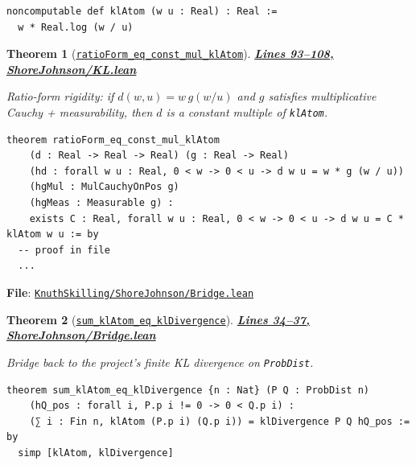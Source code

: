 \documentclass[11pt]{article}
\newtheorem{theorem}{Theorem}[section]
\theoremstyle{definition}
\theoremstyle{remark}
\begin{document}
\begin{lstlisting}[caption={KL atom divergence}]
noncomputable def klAtom (w u : Real) : Real :=
  w * Real.log (w / u)
\end{lstlisting}

\begin{theorem}[\href{https://github.com/zariuq/ks-foundations-of-inference/blob/main/KnuthSkilling/ShoreJohnson/KL.lean\#L93}{\texttt{ratioForm\_eq\_const\_mul\_klAtom}}]
\textbf{\href{https://github.com/zariuq/ks-foundations-of-inference/blob/main/KnuthSkilling/ShoreJohnson/KL.lean\#L93-L108}{Lines 93--108, ShoreJohnson/KL.lean}}

Ratio-form rigidity: if $d(w,u)=w \, g(w/u)$ and $g$ satisfies multiplicative Cauchy + measurability, then
$d$ is a constant multiple of \texttt{klAtom}.
\end{theorem}

\begin{lstlisting}[caption={Ratio-form rigidity -> constant multiple of klAtom}]
theorem ratioForm_eq_const_mul_klAtom
    (d : Real -> Real -> Real) (g : Real -> Real)
    (hd : forall w u : Real, 0 < w -> 0 < u -> d w u = w * g (w / u))
    (hgMul : MulCauchyOnPos g)
    (hgMeas : Measurable g) :
    exists C : Real, forall w u : Real, 0 < w -> 0 < u -> d w u = C * klAtom w u := by
  -- proof in file
  ...
\end{lstlisting}

\textbf{File}: \href{https://github.com/zariuq/ks-foundations-of-inference/blob/main/KnuthSkilling/ShoreJohnson/Bridge.lean}{\texttt{KnuthSkilling/ShoreJohnson/Bridge.lean}}

\begin{theorem}[\href{https://github.com/zariuq/ks-foundations-of-inference/blob/main/KnuthSkilling/ShoreJohnson/Bridge.lean\#L34}{\texttt{sum\_klAtom\_eq\_klDivergence}}]
\textbf{\href{https://github.com/zariuq/ks-foundations-of-inference/blob/main/KnuthSkilling/ShoreJohnson/Bridge.lean\#L34-L37}{Lines 34--37, ShoreJohnson/Bridge.lean}}

Bridge back to the project’s finite KL divergence on \texttt{ProbDist}.
\end{theorem}

\begin{lstlisting}[caption={Finite KL divergence is the sum of KL atoms}]
theorem sum_klAtom_eq_klDivergence {n : Nat} (P Q : ProbDist n)
    (hQ_pos : forall i, P.p i != 0 -> 0 < Q.p i) :
    (∑ i : Fin n, klAtom (P.p i) (Q.p i)) = klDivergence P Q hQ_pos := by
  simp [klAtom, klDivergence]
\end{lstlisting}
\end{document}
